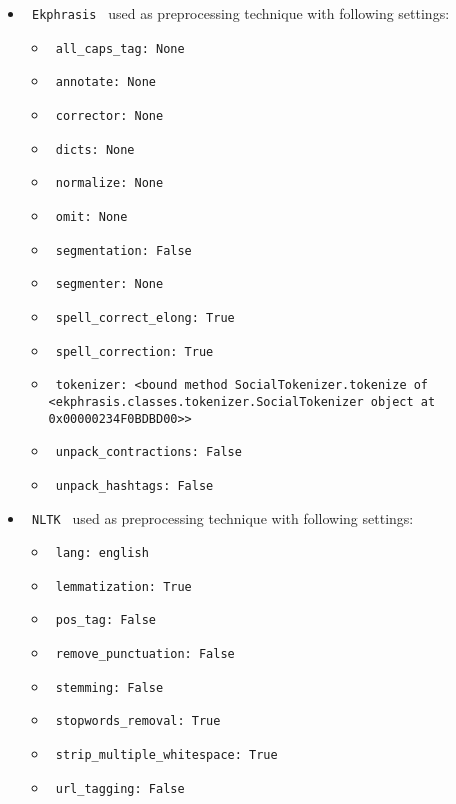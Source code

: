 \documentclass[11pt]{article}
\begin{document}
\begin{itemize}
    \item
     \verb| Ekphrasis | used as preprocessing technique with following settings:
     \begin{itemize}
             \item
            \verb| all_caps_tag: None|
             \item
            \verb| annotate: None|
             \item
            \verb| corrector: None|
             \item
            \verb| dicts: None|
             \item
            \verb| normalize: None|
             \item
            \verb| omit: None|
             \item
            \verb| segmentation: False|
             \item
            \verb| segmenter: None|
             \item
            \verb| spell_correct_elong: True|
             \item
            \verb| spell_correction: True|
             \item
            \verb| tokenizer: <bound method SocialTokenizer.tokenize of <ekphrasis.classes.tokenizer.SocialTokenizer object at 0x00000234F0BDBD00>>|
             \item
            \verb| unpack_contractions: False|
             \item
            \verb| unpack_hashtags: False|
           \end{itemize}
    \item
     \verb| NLTK | used as preprocessing technique with following settings:
     \begin{itemize}
             \item
            \verb| lang: english|
             \item
            \verb| lemmatization: True|
             \item
            \verb| pos_tag: False|
             \item
            \verb| remove_punctuation: False|
             \item
            \verb| stemming: False|
             \item
            \verb| stopwords_removal: True|
             \item
            \verb| strip_multiple_whitespace: True|
             \item
            \verb| url_tagging: False|
           \end{itemize}
\end{itemize}
\hfill\break
\hfill\break
\end{document}
